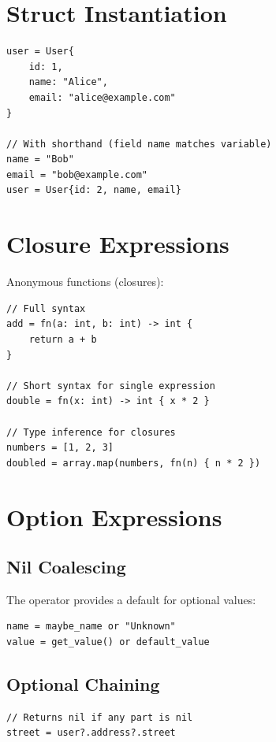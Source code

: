 \section{Struct Instantiation}

\begin{lstlisting}
user = User{
    id: 1,
    name: "Alice",
    email: "alice@example.com"
}

// With shorthand (field name matches variable)
name = "Bob"
email = "bob@example.com"
user = User{id: 2, name, email}
\end{lstlisting}

\section{Closure Expressions}

Anonymous functions (closures):

\begin{lstlisting}
// Full syntax
add = fn(a: int, b: int) -> int {
    return a + b
}

// Short syntax for single expression
double = fn(x: int) -> int { x * 2 }

// Type inference for closures
numbers = [1, 2, 3]
doubled = array.map(numbers, fn(n) { n * 2 })
\end{lstlisting}

\section{Option Expressions}

\subsection{Nil Coalescing}

The  operator provides a default for optional values:

\begin{lstlisting}
name = maybe_name or "Unknown"
value = get_value() or default_value
\end{lstlisting}

\subsection{Optional Chaining}

\begin{lstlisting}
// Returns nil if any part is nil
street = user?.address?.street
\end{lstlisting}

